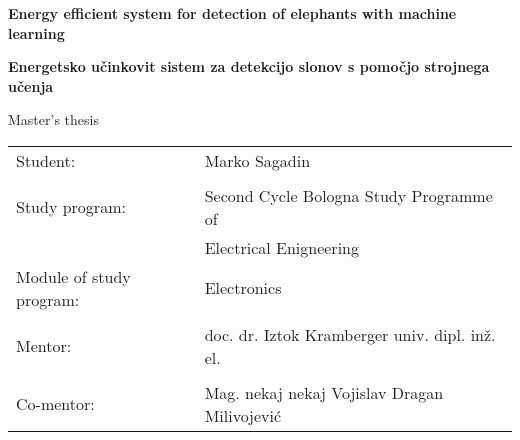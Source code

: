 \begin{center}

    \vspace*{4.0cm}
    \fontsize{26}{26}
    \selectfont
    \textbf{Energy efficient system for detection of elephants with machine learning}

    \vspace{1.0cm}

    \fontsize{26}{26}
    \selectfont
    \textbf{Energetsko učinkovit sistem za detekcijo slonov s pomočjo strojnega učenja}

    \vspace{1.0cm}

    \fontsize{16}{18}
    \selectfont
    Master's thesis

\end{center}

\vspace*{\fill}

\begin{tabular}{ l l }
    Student: & Marko Sagadin  \\ 
             & \\
    Study program: & Second Cycle Bologna Study Programme of\\  
                   & Electrical Enigneering \\
    Module of study program: & Electronics \\
                             & \\
    Mentor: & doc. dr. Iztok Kramberger univ. dipl. inž. el. \\
            & \\
    Co-mentor: & Mag. nekaj nekaj Vojislav Dragan Milivojević \\
\end{tabular}

\newpage
